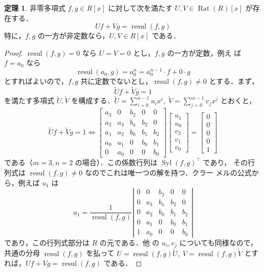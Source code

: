 \documentclass[12pt, uplatex, dvipdfmx]{jsarticle}
\newcommand{\ds}{\displaystyle}
\theoremstyle{definition}
\newtheorem{theorem}{定理}
\DeclareMathOperator{\Syl}{Syl}
\DeclareMathOperator{\resul}{resul}
\DeclareMathOperator{\Rat}{Rat}
\begin{document}
\begin{theorem}\label{thm:gcdlike}
  非零多項式 $f,g \in R[x]$ に対して次を満たす $U,V \in \Rat(R)[x]$ が存在する．
  \[
    Uf + V g = \resul(f,g)
  \]
  特に，$f,g$ の一方が非定数なら，$U, V \in R[x]$ である．
\end{theorem}

\begin{proof}
  $\resul(f,g)=0$ なら $U=V=0$ とし，$f,g$ の一方が定数，例え
  ば $f=a_0$ なら
  \[
    \resul(a_0, g) = a_0^n = a_0^{n-1}\cdot  f + 0\cdot g
  \]
  とすればよいので，$f,g$ 共に定数でないとし，$\resul(f,g) \neq 0$ とする．まず，
  \[
    \tilde{U} f + \tilde{V}g = 1
  \]
  を満たす多項式 $\tilde{U}, \tilde{V}$
  を構成する．$\ds \tilde{U}=\sum_{i=0}^{n-1} u_i x^i, \;
  \tilde{V}=\sum_{j=0}^{m-1}v_j x^j$ とおくと，
  \[
    \tilde{U}f+\tilde{V}g=1 \Leftrightarrow \left[
      \begin{array}{ccccc}
        a_3 & 0 & b_2 & 0 & 0\\
        a_2 & a_3 & b_a & b_2 & 0\\
        a_1 & a_2 & b_0 & b_1 & b_2\\
        a_0 & a_1 & 0 & b_0 & b_1\\
        0 & a_0 & 0 & 0 & b_0
      \end{array}
    \right] \left[
      \begin{array}{c}
        u_1\\
        u_0\\
        v_2\\
        v_1\\
        v_0
      \end{array}
    \right] = \left[
      \begin{array}{c}
        0\\
        0\\
        0\\
        0\\
        1
      \end{array}
    \right] 
  \]
  である（$m=3, n=2$ の場合）．この係数行列は $\Syl(f,g)^{\top}$ であり，
  その行列式は $\resul(f,g)\neq 0$ なのでこれは唯一つの解を持つ．クラー
  メルの公式から，例えば $u_1$ は
  \[
    u_1 = \frac{1}{\resul(f,g)} \left|
      \begin{array}{ccccc}
        0 & 0 & b_2 & 0 & 0\\
        0 & a_3 & b_a & b_2 & 0\\
        0 & a_2 & b_0 & b_1 & b_2\\
        0 & a_1 & 0 & b_0 & b_1\\
        1 & a_0 & 0 & 0 & b_0
      \end{array}
    \right|
  \]
  であり，この行列式部分は $R$ の元である．他
  の $u_i, v_j$
  についても同様なので，共通の分母 $\resul(f,g)$ を払って $U = \resul(f,g) \tilde{U}, \; V=
  \resul(f,g) \tilde{V}$ とすれば，$U f + V g = \resul(f,g)$ である．
\end{proof}
\end{document}
